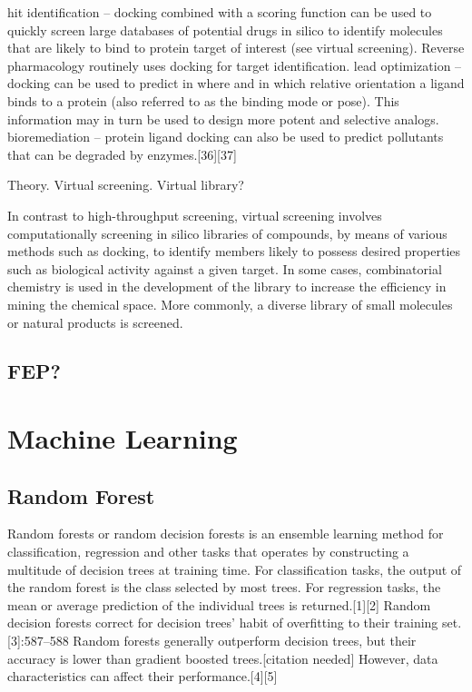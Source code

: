 hit identification – docking combined with a scoring function can be used to quickly screen large databases of potential drugs in silico to identify molecules that are likely to bind to protein target of interest (see virtual screening). Reverse pharmacology routinely uses docking for target identification.
lead optimization – docking can be used to predict in where and in which relative orientation a ligand binds to a protein (also referred to as the binding mode or pose). This information may in turn be used to design more potent and selective analogs.
bioremediation – protein ligand docking can also be used to predict pollutants that can be degraded by enzymes.[36][37]

Theory. Virtual screening. Virtual library?

In contrast to high-throughput screening, virtual screening involves computationally screening in silico libraries of compounds, by means of various methods such as docking, to identify members likely to possess desired properties such as biological activity against a given target. In some cases, combinatorial chemistry is used in the development of the library to increase the efficiency in mining the chemical space. More commonly, a diverse library of small molecules or natural products is screened.

\subsection{FEP?}

\section{Machine Learning}

\subsection{Random Forest}

Random forests or random decision forests is an ensemble learning method for classification, regression and other tasks that operates by constructing a multitude of decision trees at training time. For classification tasks, the output of the random forest is the class selected by most trees. For regression tasks, the mean or average prediction of the individual trees is returned.[1][2] Random decision forests correct for decision trees' habit of overfitting to their training set.[3]:587–588 Random forests generally outperform decision trees, but their accuracy is lower than gradient boosted trees.[citation needed] However, data characteristics can affect their performance.[4][5]

